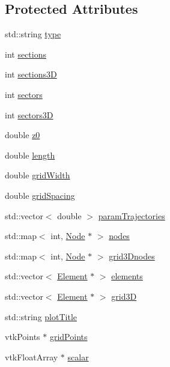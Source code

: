 \subsection*{Protected Attributes}
\begin{DoxyCompactItemize}
\item 
std\-::string \hyperlink{classGeometry_a734ed6644e4e3b98f157e6707c30069a}{type}
\item 
int \hyperlink{classGeometry_a0efc4bf9252077abca96c1c198eefa33}{sections}
\item 
int \hyperlink{classGeometry_a296e0b45bd0e03ccdcee990cd1ee6ccb}{sections3\-D}
\item 
int \hyperlink{classGeometry_a5e34644bfae4c1df92cb6bf98a8c62c7}{sectors}
\item 
int \hyperlink{classGeometry_a910a84dcf141a4f6eb3f565ac69339b6}{sectors3\-D}
\item 
double \hyperlink{classGeometry_a755ef6125e306d96ba8b4a01f3593b66}{z0}
\item 
double \hyperlink{classGeometry_a83cd2f4ce607b1b70227780181b197c6}{length}
\item 
double \hyperlink{classGeometry_a047dd3be42ddff67aa9f8d494e7e8568}{grid\-Width}
\item 
double \hyperlink{classGeometry_aaddc1973a36683418ff6c00fb9a0e200}{grid\-Spacing}
\item 
std\-::vector$<$ double $>$ \hyperlink{classGeometry_a90ddae3ca87d3c358e2f63611c244be7}{param\-Trajectories}
\item 
std\-::map$<$ int, \hyperlink{classNode}{Node} $\ast$ $>$ \hyperlink{classGeometry_a9f5642ca54e0353b871d733e25ccc56e}{nodes}
\item 
std\-::map$<$ int, \hyperlink{classNode}{Node} $\ast$ $>$ \hyperlink{classGeometry_a64335b4700461be035cf7e89b7782cb6}{grid3\-Dnodes}
\item 
std\-::vector$<$ \hyperlink{classElement}{Element} $\ast$ $>$ \hyperlink{classGeometry_acef6e83971679a9c4672c3b610acb58e}{elements}
\item 
std\-::vector$<$ \hyperlink{classElement}{Element} $\ast$ $>$ \hyperlink{classGeometry_a08864bd3e1225949b6617f94ab1af9ab}{grid3\-D}
\item 
std\-::string \hyperlink{classGeometry_aed9f7f434ae099a62be5c20f9915be90}{plot\-Title}
\item 
vtk\-Points $\ast$ \hyperlink{classGeometry_aed47a80e867e618e98272e830d297deb}{grid\-Points}
\item 
vtk\-Float\-Array $\ast$ \hyperlink{classGeometry_a49e66de69aa22b88759e903e1ae06c9b}{scalar}

\end{DoxyCompactItemize}
